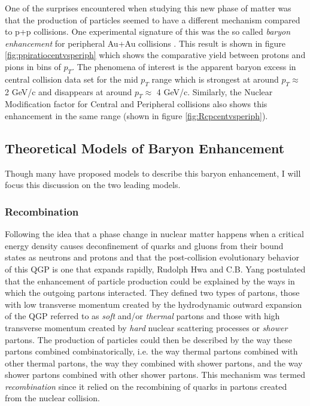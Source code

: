 One of the surprises encountered when studying this new phase of matter was that the production of particles seemed to have a different mechanism compared to p+p collisions. One experimental signature of this was the so called \textit{baryon enhancement} for peripheral Au+Au collisions \citep{PhysRevLett.97.152301}. This result is shown in figure \ref{fig:ppiratiocentvsperiph} which shows the comparative yield between protons and pions in bins of $p_{T}$. The phenomena of interest is the apparent baryon excess in central collision data set for the mid $p_{T}$ range which is strongest at around $p_{T}\approx$ 2 GeV/c and disappears at around $p_{T}\approx$ 4 GeV/c. Similarly, the Nuclear Modification factor for Central and Peripheral collisions also shows this enhancement in the same range (shown in figure \ref{fig:Rcpcentvsperiph}).

\subsection{Theoretical Models of Baryon Enhancement}
Though many have proposed models to describe this baryon enhancement, I will focus this discussion on the two leading models.

\subsubsection{Recombination}
Following the idea that a phase change in nuclear matter happens when a critical energy density causes deconfinement of quarks and gluons from their bound states as neutrons and protons and that the post-collision evolutionary behavior of this QGP is one that expands rapidly, Rudolph Hwa and C.B. Yang postulated that the enhancement of particle production could be explained by the ways in which the outgoing partons interacted\citep{PhysRevC.70.024905}. They defined two types of partons, those with low transverse momentum created by the hydrodynamic outward expansion of the QGP referred to as \textit{soft} and/or \textit{thermal} partons and those with high transverse momentum created by \textit{hard} nuclear scattering processes or \textit{shower} partons. The production of particles could then be described by the way these partons combined combinatorically, i.e. the way thermal partons combined with other thermal partons, the way they combined with shower partons, and the way shower partons combined with other shower partons. This mechanism was termed \textit{recombination} since it relied on the recombining of quarks in partons created from the nuclear collision.

